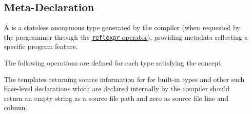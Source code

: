 \subsection{Meta-Declaration}
\label{concept-Meta-Declaration}

A  is a stateless anonymous type generated by the compiler
(when requested by the programmer through the 
\hyperref[section-reflection-operator]{\texttt{reflexpr} operator}),
providing metadata reflecting a specific program feature.





The following operations are defined for each type satisfying the 
concept.



The templates returning source information for for built-in types and other
such base-level declarations which are declared internally by the compiler
should return an empty string as a source file path and zero as source file
line and column.
